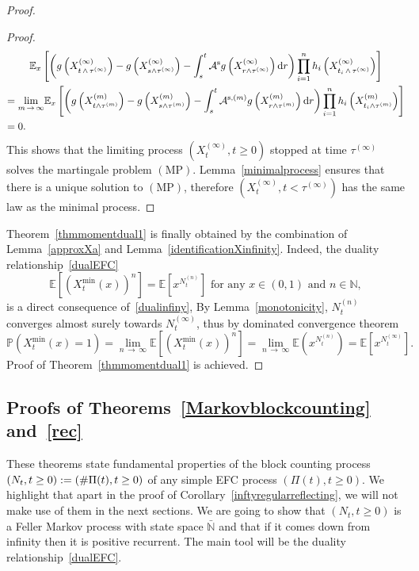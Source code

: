 \documentclass[AHL,Unicode,longabstracts,published]{cedram}
\newcommand{\ddr}{\mathrm{d}}
\newcommand{\rms}{\mathrm{s}}
\newcommand{\MP}{\mathrm{MP}}
\newcommand{\bbN}{\mathbb{N}}
\newcommand{\bbE}{\mathbb{E}}
\newcommand{\bbP}{\mathbb{P}}
\newcommand{\clA}{\mathcal{A}}
\begin{document}
\begin{proof}
\begin{proof}
\begin{multline*}
\bbE_x\left[\left(g\left(X_{t\,\wedge\,\tau^{(\infty)}}^{(\infty)}\right)-g\left(X_{s\wedge \tau^{(\infty)}}^{(\infty)}\right)-\int_{s}^{t}\clA^{\rms}g\left(X_{r\wedge \tau^{(\infty)}}^{(\infty)}\right)\ddr r\right)\prod_{i=1}^{n}h_i\left(X_{t_i\,\wedge\,\tau^{(\infty)}}^{(\infty)}\right)\right]\\
\mkern-5mu{\begin{aligned}
&=\underset{m\,\rightarrow\,\infty}{\lim} \bbE_x\left[\left(g\left(X_{t\wedge \tau^{(m)}}^{(m)}\right)-g\left(X_{s\wedge \tau^{(m)}}^{(m)}\right)-\int_{s}^{t}\clA^{\rms,(m)}g\left(X_{r\wedge \tau^{(m)}}^{(m)}\right)\ddr r\right)\prod_{i=1}^{n}h_i\left(X_{t_i\wedge \tau^{(m)}}^{(m)}\right)\right]\\
&=0.
\end{aligned}}
\end{multline*}
This shows that the limiting process $(X^{(\infty)}_t,t\geq 0)$ stopped at time $\tau^{(\infty)}$ solves the martingale problem $(\MP)$. Lemma~\ref{minimalprocess} ensures that there is a unique solution to $(\MP)$, therefore $(X^{(\infty)}_t,t<\tau^{(\infty)})$ has the same law as the minimal process.
\end{proof}

Theorem~\ref{thmmomentdual1} is finally obtained by the combination of Lemma~\ref{approxXa} and Lemma~\ref{identificationXinfinity}. Indeed, the duality relationship~\eqref{dualEFC}
\[
\bbE\left[\left(X_t^{\min}(x)\right)^n\right]=\bbE\left[x^{N_t^{(n)}}\right] \text{ for any } x\in (0,1) \text{ and } n\in \bbN,
\]
is a direct consequence of~\eqref{dualinfiny}, By Lemma~\ref{monotonicity}, $N_t^{(n)}$ converges almost surely towards $N_t^{(\infty)}$, thus by dominated convergence theorem
\begin{equation}\label{entrancelawN0}
\bbP\left(X_t^{\min}(x)=1\right)=\underset{n\,\rightarrow\,\infty}{\lim} \bbE\left[\left(X_t^{\min}(x)\right)^n\right]=\underset{n\,\rightarrow\,\infty}{\lim} \bbE\left(x^{N_t^{(n)}}\right)=\bbE\left[x^{N_t^{(\infty)}}\right].
\end{equation}
Proof of Theorem~\ref{thmmomentdual1} is achieved.
\end{proof}


\subsection{Proofs of Theorems~\ref{Markovblockcounting} and~\ref{rec}}
These theorems state fundamental properties of the block counting process $(N_t,\linebreak t\geq 0):=(\#\Pi(t),t\geq 0)$ of any simple EFC process $(\Pi(t),t\geq 0)$. We highlight that apart in the proof of Corollary~\ref{inftyregularreflecting}, we will not make use of them in the next sections. We are going to show that $(N_t,t\geq 0)$ is a Feller Markov process with state space $\bar{\bbN}$ and that if it comes down from infinity then it is positive recurrent. The main tool will be the duality relationship~\eqref{dualEFC}.
\end{document}
